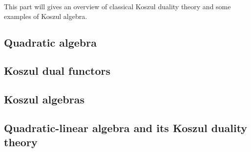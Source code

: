 This part will gives an overview of classical Koszul duality theory and some examples of Koszul algebra.
\subsection{Quadratic algebra}
    
\subsection{Koszul dual functors}
    
\subsection{Koszul algebras}
    
\subsection{Quadratic-linear algebra and its Koszul duality theory }
    